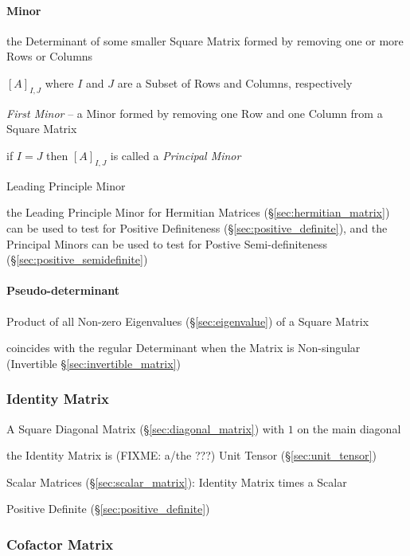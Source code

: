 \paragraph{Minor}\label{sec:minor}\hfill

the Determinant of some smaller Square Matrix formed by removing one or more
Rows or Columns

$[A]_{I,J}$ where $I$ and $J$ are a Subset of Rows and Columns, respectively

\emph{First Minor} -- a Minor formed by removing one Row and one Column from a
Square Matrix

if $I = J$ then $[A]_{I,J}$ is called a \emph{Principal Minor}

Leading Principle Minor

the Leading Principle Minor for Hermitian Matrices
(\S\ref{sec:hermitian_matrix}) can be used to test for Positive Definiteness
(\S\ref{sec:positive_definite}), and the Principal Minors can be used to test
for Postive Semi-definiteness (\S\ref{sec:positive_semidefinite})



\paragraph{Pseudo-determinant}\label{sec:pseudo_determinant}\hfill

Product of all Non-zero Eigenvalues (\S\ref{sec:eigenvalue}) of a Square Matrix

coincides with the regular Determinant when the Matrix is Non-singular
(Invertible \S\ref{sec:invertible_matrix})



\subsubsection{Identity Matrix}\label{sec:identity_matrix}

A Square Diagonal Matrix (\S\ref{sec:diagonal_matrix}) with $1$ on the main
diagonal

the Identity Matrix is (FIXME: a/the ???) Unit Tensor (\S\ref{sec:unit_tensor})

Scalar Matrices (\S\ref{sec:scalar_matrix}): Identity Matrix times a Scalar

Positive Definite (\S\ref{sec:positive_definite})



\subsubsection{Cofactor Matrix}\label{sec:cofactor_matrix}

